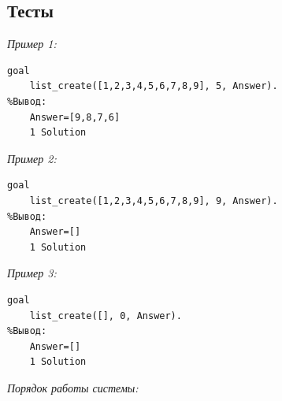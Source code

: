 \documentclass[a4paper,12pt]{article}
\begin{document}
\subsection*{Тесты}

\textit{Пример 1:}

\begin{verbatim}
goal
	list_create([1,2,3,4,5,6,7,8,9], 5, Answer).
%Вывод:
	Answer=[9,8,7,6]
	1 Solution
\end{verbatim}

\textit{Пример 2:}

\begin{verbatim}
goal
	list_create([1,2,3,4,5,6,7,8,9], 9, Answer).
%Вывод:
	Answer=[]
	1 Solution
\end{verbatim}

\textit{Пример 3:}

\begin{verbatim}
goal
	list_create([], 0, Answer).
%Вывод:
	Answer=[]
	1 Solution
\end{verbatim}

\textit{Порядок работы системы:}
\end{document}
